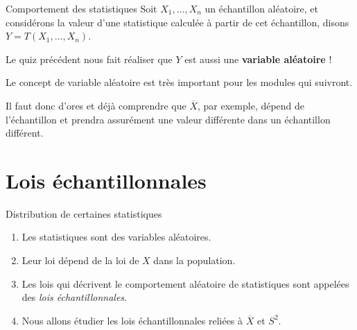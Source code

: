 \documentclass{BeamerTemplate}
\begin{document}
\begin{frame}[t]{Comportement des statistiques}
  Soit $X_1,\dots,X_n$ un échantillon aléatoire, et considérons
  la valeur d'une statistique calculée à partir de cet échantillon, disons $Y=T(X_1,\dots,X_n)$.

  Le quiz précédent nous fait réaliser que \alert{$Y$ est aussi une {\bf variable aléatoire}} !

\vspace{1cm}
    Le concept de variable aléatoire est très important pour les modules qui suivront.

    \medskip
    Il faut donc d'ores et déjà comprendre que $\overline{X}$, par exemple, dépend de l'échantillon et prendra \alert{assurément} une valeur différente dans un échantillon différent. 

\end{frame}


\section{Lois échantillonnales}

\begin{frame}[t]{Distribution de certaines statistiques}
\begin{enumerate}[$\bullet$]
\item Les statistiques sont des \alert{variables aléatoires}.
\item Leur loi dépend de la loi de $X$ dans la population.
 \item Les lois qui décrivent le comportement aléatoire de statistiques sont appelées des {\it lois échantillonnales}. %
\item Nous allons étudier les lois échantillonnales reliées à $\overline{X}$ et $S^2$.
\end{enumerate}

\end{frame}
\end{document}
